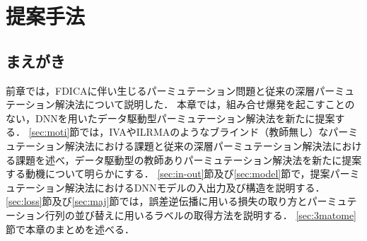 
\chapter{提案手法}
\label{chap:proposed}

\section{まえがき}
前章では，FDICAに伴い生じるパーミュテーション問題と従来の深層パーミュテーション解決法について説明した．
本章では，組み合せ爆発を起こすことのない，DNNを用いたデータ駆動型パーミュテーション解決法を新たに提案する．
\ref{sec:moti}節では，IVAやILRMAのようなブラインド（教師無し）なパーミュテーション解決法における課題と従来の深層パーミュテーション解決法における課題を述べ，データ駆動型の教師ありパーミュテーション解決法を新たに提案する動機について明らかにする．
\ref{sec:in-out}節及び\ref{sec:model}節で，提案パーミュテーション解決法におけるDNNモデルの入出力及び構造を説明する．
\ref{sec:loss}節及び\ref{sec:maj}節では，誤差逆伝播に用いる損失の取り方とパーミュテーション行列の並び替えに用いるラベルの取得方法を説明する．
\ref{sec:3matome}節で本章のまとめを述べる．

